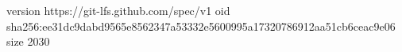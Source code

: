 version https://git-lfs.github.com/spec/v1
oid sha256:ee31dc9dabd9565e8562347a53332e5600995a17320786912aa51cb6ceac9e06
size 2030
